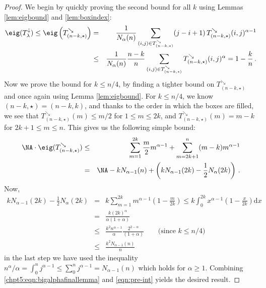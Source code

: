\documentclass[11pt]{report}
\begin{document}
\begin{proof}
	We begin by quickly proving the second bound for all $k$ using Lemmas \ref{lem:eigbound} and \ref{lem:boxindex}:
	\begin{eqnarray*}
		\eig(T_{\lambda}^{\downarrow}) \leq  
		\eig\left(T_{(n-k,\star)}^{\searrow}\right) & = & \frac{1}{N_\alpha(n)} \sum_{(i,j) \in T_{(n-k,\star)}^{\searrow}} (j-i +1)  \, T_{(n-k,\star)}^{\searrow}(i,j)^{\alpha-1} \\
		& \leq &	\frac{1}{N_\alpha(n)} \frac{n-k}{n} \sum_{(i,j) \in T_{(n-k,\star)}^{\searrow}} T_{(n-k,\star)}^{\searrow}(i,j)^{\alpha} =1 -\frac{k}{n}\,.
	\end{eqnarray*}
	Now we prove the bound for $k\leq n/4$, by finding a tighter bound on 
	$T_{(n-k,\star)}^{\searrow}$ and once again using Lemma \ref{lem:eigbound}. For $k\le n/4$, we know 
	$(n-k,\star) = (n-k,k)$, and thanks to the order in which the boxes are filled, we see that $T_{(n-k,\star)}^{\searrow}(m) \leq m/2$ for $1\leq m\leq 2k$, and $T_{(n-k,\star)}^{\searrow}(m) = m-k$ for $2k+1\leq m\leq n$. This gives us the following simple bound:
	\begin{eqnarray}
	\NA \cdot \eig(T_{(n-k,\star)}^{\searrow}) & \leq & \sum_{m=1}^{2k} 
	\frac{m}{2} m^{\alpha-1} + \sum_{m=2k+1}^{n} (m-k) m^{\alpha-1} \nonumber \\ 
	& = & \NA - k N_{\alpha-1}(n)+ \left( k N_{\alpha-1}(2k)-  \frac12 N_\alpha(2k)\right) \,. \label{eqn:pre-int}
	\end{eqnarray}
	Now, 
	\begin{eqnarray}
	k N_{\alpha-1}(2k)-  \frac12 N_\alpha(2k) & = & k \sum_{m=1}^{2k} m 
	^{\alpha-1}\left(1 - \frac{m}{2k}\right) 
	\leq k \int_{0}^{2k} x^{\alpha-1}\left(1 - 
	\frac{x}{2k}\right)\mathrm{d} x  \nonumber\\
	&=& \frac{k(2k)^\alpha}{\alpha(1+\alpha)} \nonumber \\
	&\leq & \frac{k^2 n^{\alpha-1}}{\alpha} \frac{2^{2-\alpha}}{(1+\alpha)} \qquad\text{(since $k\leq n/4$)} \nonumber \\
	&\leq & \frac{k^2 N_{\alpha-1}(n)}{n}  \label{chpt5:eqn:bigalphafinallemma}
	\end{eqnarray}
	in the last step we have used the inequality $n^{\alpha}/\alpha = \int^{n}_{0} j^{\alpha-1} \leq \sum^{n}_{0} j^{\alpha-1}  =  N_{\alpha-1}(n) $ which holds for $\alpha \geq 1$. Combining \eqref{chpt5:eqn:bigalphafinallemma} and \eqref{eqn:pre-int} yields the desired result.	
\end{proof}
\end{document}
